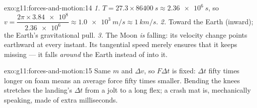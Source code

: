 \begin{solution}{exo:g11:forces-and-motion:14}
\emph{1.} $T = 27.3 \times \qty{86400}{s} \approx \qty{2.36e6}{s}$, so
$v = \dfrac{2\pi \times \num{3.84e8}}{\num{2.36e6}} \approx
\qty{1.0e3}{m/s} \approx \qty{1}{km/s}$. \emph{2.} Toward the Earth
(inward); the Earth's gravitational pull. \emph{3.} The Moon \emph{is}
falling: its velocity change points earthward at every instant. Its
tangential speed merely ensures that it keeps missing --- it falls
\emph{around} the Earth instead of into it.
\end{solution}

\begin{solution}{exo:g11:forces-and-motion:15}
Same $m$ and $\Delta v$, so $F\Delta t$ is fixed: $\Delta t$ fifty
times longer on foam means an average force fifty times smaller.
Bending the knees stretches the landing's $\Delta t$ from a jolt to a
long flex; a crash mat is, mechanically speaking, made of extra
milliseconds.
\end{solution}

